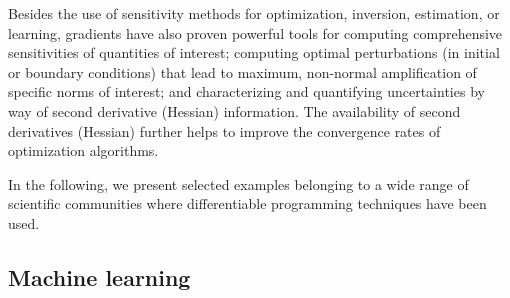 Besides the use of sensitivity methods for optimization, inversion, estimation, or learning, gradients have also proven powerful tools for computing comprehensive sensitivities of quantities of interest; computing optimal perturbations (in initial or boundary conditions) that lead to maximum, non-normal amplification of specific norms of interest; and characterizing and quantifying uncertainties by way of second derivative (Hessian) information.
The availability of second derivatives (Hessian) further helps to improve the convergence rates of optimization algorithms.

In the following, we present selected examples belonging to a wide range of scientific communities where differentiable programming techniques have been used. 

\subsection{Machine learning}

